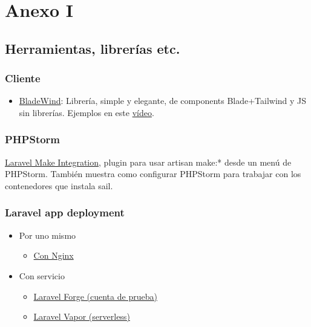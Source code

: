 \documentclass[11pt]{article}
\begin{document}
\newpage


\section{Anexo I}
\label{sec:org1c095b1}
\subsection{Herramientas, librerías etc.}
\label{sec:org2481fe6}
\subsubsection{Cliente}
\label{sec:orgef1c2e7}
\begin{itemize}
\item \href{https://bladewindui.com/}{BladeWind}: Librería, simple y elegante, de components
Blade+Tailwind y JS sin librerías. Ejemplos en este \href{https://www.youtube.com/watch?v=UoKa5aKkv1U}{vídeo}.
\end{itemize}

\subsubsection{PHPStorm}
\label{sec:orge0f831d}
\href{https://github.com/NiclasvanEyk/jetbrains-laravel-make-integration/blob/main/docs/setup\_with\_sail.md}{Laravel Make Integration}, plugin para usar artisan make:* desde un
menú de PHPStorm. También muestra como configurar PHPStorm para
trabajar con los contenedores que instala sail.

\subsubsection{Laravel app deployment}
\label{sec:org50ccce0}
\begin{itemize}
\item Por uno mismo
\begin{itemize}
\item \href{https://laravel.com/docs/9.x/deployment}{Con Nginx}
\end{itemize}
\item Con servicio
\begin{itemize}
\item \href{https://bootcamp.laravel.com/deploying}{Laravel Forge (cuenta de prueba)}
\item \href{https://vapor.laravel.com/}{Laravel Vapor (serverless)}
\end{itemize}
\end{itemize}
\end{document}
